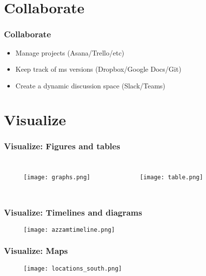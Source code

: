 \documentclass{beamer}
\begin{document}
\section{Collaborate}

\begin{frame}
\frametitle{Collaborate}
    \begin{itemize}
        \item Manage projects (Asana/Trello/etc)
        \item Keep track of ms versions (Dropbox/Google Docs/Git)
        \item Create a dynamic discussion space (Slack/Teams)
    \end{itemize}
\end{frame}

\section{Visualize}

\begin{frame}
\frametitle{Visualize: \newline Figures and tables}
    \begin{columns}
            \begin{figure}
                \centering
                \texttt{[image: graphs.png]}
            \end{figure}
            \begin{figure}
                \centering
                \texttt{[image: table.png]}
            \end{figure}
    \end{columns}
\end{frame}

\begin{frame}
\frametitle{Visualize: \newline Timelines and diagrams}
    \begin{figure}
        \centering
        \texttt{[image: azzamtimeline.png]}
    \end{figure}
\end{frame}

\begin{frame}
\frametitle{Visualize: \newline Maps}
    \begin{figure}
        \centering
        \texttt{[image: locations\_south.png]}
    \end{figure}
\end{frame}
\end{document}
